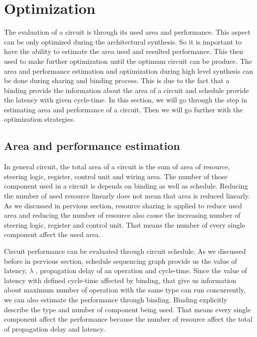 \section{Optimization}


The evaluation of a circuit is through its used area and performance. This aspect can be only optimized during the architectural synthesis. So it is important to have the ability to estimate the area used and resulted performance. This then used to make further optimization until the optimum circuit can be produce. The area and performance estimation and optimization during high level synthesis can be done during sharing and binding process. This is due to the fact that a binding provide the information about the area of a circuit and schedule provide the latency with given cycle-time. In this section, we will go through the step in estimating area and performance of a circuit. Then we will go further with the optimization strategies.



\subsection{Area and performance estimation}

In general circuit, the total area of a circuit is the sum of area of resource, steering logic, register, control unit and wiring area. The number of those component used in a circuit is depends on binding as well as schedule. Reducing the number of used resource linearly does not mean that area is reduced linearly. As we discussed in pervious section, resource sharing is applied to reduce used area and reducing the number of resource also cause the increasing number of steering logic, register and control unit. That means the number of every single component affect the used area.

Circuit performance can be evaluated through circuit schedule. As we discussed before in pervious section, schedule sequencing graph provide us the value of latency, $\lambda$ , propagation delay of an operation and cycle-time. Since the value of latency with defined cycle-time affected by binding, that give us information about maximum number of operation with the same type can run concurrently, we can also estimate the performance through binding. Binding explicitly describe the type and number of component being used. That means every single component affect the performance because the number of resource affect the total of propagation delay and latency.


